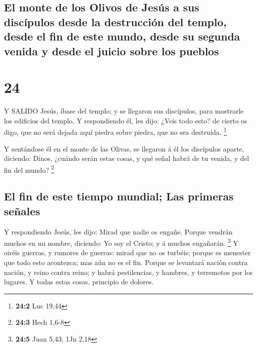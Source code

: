 \hypertarget{el-monte-de-los-olivos-de-jesuxfas-a-sus-discuxedpulos-desde-la-destrucciuxf3n-del-templo-desde-el-fin-de-este-mundo-desde-su-segunda-venida-y-desde-el-juicio-sobre-los-pueblos}{%
\subsection{El monte de los Olivos de Jesús a sus discípulos desde la
destrucción del templo, desde el fin de este mundo, desde su segunda
venida y desde el juicio sobre los
pueblos}\label{el-monte-de-los-olivos-de-jesuxfas-a-sus-discuxedpulos-desde-la-destrucciuxf3n-del-templo-desde-el-fin-de-este-mundo-desde-su-segunda-venida-y-desde-el-juicio-sobre-los-pueblos}}

\hypertarget{section-23}{%
\section{24}\label{section-23}}

 Y SALIDO Jesús, íbase del templo; y se llegaron sus
discípulos, para mostrarle los edificios del templo.  Y
respondiendo él, les dijo: ¿Veis todo esto? de cierto os digo, que no
será dejada aquí piedra sobre piedra, que no sea destruída. \footnote{\textbf{24:2}
  Luc 19,44}

 Y sentándose él en el monte de las Olivas, se llegaron á él
los discípulos aparte, diciendo: Dinos, ¿cuándo serán estas cosas, y qué
señal habrá de tu venida, y del fin del mundo? \footnote{\textbf{24:3}
  Hech 1,6-8}

\hypertarget{el-fin-de-este-tiempo-mundial-las-primeras-seuxf1ales}{%
\subsection{El fin de este tiempo mundial; Las primeras
señales}\label{el-fin-de-este-tiempo-mundial-las-primeras-seuxf1ales}}

 Y respondiendo Jesús, les dijo: Mirad que nadie os engañe.
 Porque vendrán muchos en mi nombre, diciendo: Yo soy el
Cristo; y á muchos engañarán. \footnote{\textbf{24:5} Juan 5,43; 1Jn
  2,18}  Y oiréis guerras, y rumores de guerras: mirad que
no os turbéis; porque es menester que todo esto acontezca; mas aún no es
el fin.  Porque se levantará nación contra nación, y reino
contra reino; y habrá pestilencias, y hambres, y terremotos por los
lugares.  Y todas estas cosas, principio de dolores.

